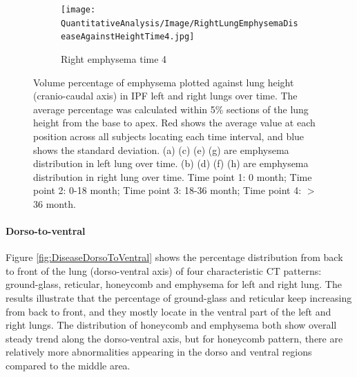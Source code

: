 \begin{figure}[H]
\begin{subfigure}{.41\linewidth}
  \label{fig:DiseaseAgainstHeightOverTime4-g} 
\end{subfigure} 
\begin{subfigure}{.41\linewidth}%
  \texttt{[image: QuantitativeAnalysis/Image/RightLungEmphysemaDiseaseAgainstHeightTime4.jpg]}
  \caption{Right emphysema time 4}
  \label{fig:DiseaseAgainstHeightOverTime4-h}
\end{subfigure}
\caption{Volume percentage of emphysema plotted against lung height (cranio-caudal axis) in IPF left and right lungs over time. The average percentage was calculated within 5\% sections of the lung height from the base to apex. Red shows the average value at each position across all subjects locating each time interval, and blue shows the standard deviation. (a) (c) (e) (g) are emphysema distribution in left lung over time. (b) (d) (f) (h) are emphysema distribution in right lung over time. Time point 1: 0 month; Time point 2: 0-18 month; Time point 3: 18-36 month; Time point 4: $>$ 36 month.}
\label{fig:DiseaseAgainstHeightOverTime4}
\end{figure}

\paragraph{Dorso-to-ventral}
Figure \ref{fig:DiseaseDorsoToVentral} shows the percentage distribution from back to front of the lung (dorso-ventral axis) of four characteristic CT patterns: ground-glass, reticular, honeycomb and emphysema for left and right lung. The results illustrate that the percentage of ground-glass and reticular keep increasing from back to front, and they mostly locate in the ventral part of the left and right lungs. The distribution of honeycomb and emphysema both show overall steady trend along the dorso-ventral axis, but for honeycomb pattern, there are relatively more abnormalities appearing in the dorso and ventral regions compared to the middle area.


